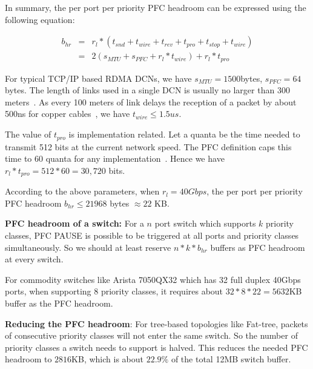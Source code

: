In summary, the per port per priority PFC headroom can be expressed using the following equation:


\begin{eqnarray} \label{eqn:pfcheadroom}
b_{hr} &=& r_{l}*(t_{snd}+t_{wire}+t_{rev}+t_{pro}+t_{stop}+t_{wire})     \nonumber \\
&=& 2(s_{MTU}+s_{PFC}+r_l*t_{wire})+r_l*t_{pro}
\end{eqnarray}

For typical TCP/IP based RDMA DCNs, we have $s_{MTU}=1500$bytes, $s_{PFC}=64$bytes. The length of links used in a single DCN is usually no larger than 300 meters~\cite{rdmaatscale}. As every 100 meters of link delays the reception of a packet by about 500ns for copper cables~\cite{pfcheadroom}, we have $t_{wire} \leq 1.5us$.  

The value of  $t_{pro}$ is implementation related. Let a quanta be the time needed to transmit 512 bits at the current network speed. The PFC definition caps this time to 60 quanta for any implementation~\cite{pfcheadroom}. Hence we have $r_l*t_{pro}=512 * 60 = 30,720 $ bits.

According to the above parameters, when  $r_l=40Gbps$, the per port per priority PFC headroom $b_{hr} \leq 21968$ bytes $\approx 22$ KB.

\textbf{PFC headroom of a switch:} For a $n$ port switch which supports $k$ priority classes, PFC PAUSE is possible to be triggered at all ports and priority classes simultaneously. So we should at least reserve $n*k*b_{hr}$ buffers as PFC headroom at every switch. 

For commodity switches like Arista 7050QX32 which has 32 full duplex 40Gbps ports, when supporting 8 priority classes, it requires about $32*8*22=5632$KB buffer as the PFC headroom.

\textbf{Reducing the PFC headroom}: For tree-based topologies like Fat-tree, packets of consecutive priority classes will not enter the same switch. So the number of priority classes a switch needs to support is halved.  This reduces the needed PFC headroom to $2816$KB, which is about $22.9\%$ of the total 12MB switch buffer.



